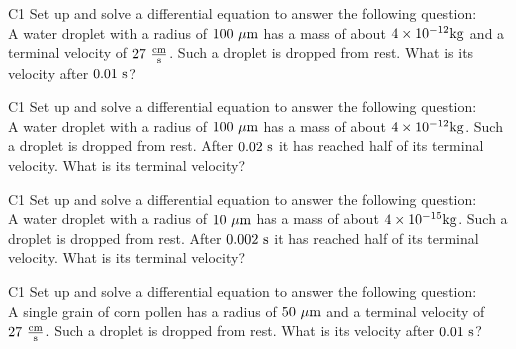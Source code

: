 \begin{problem}{C1}
Set up and solve a differential equation to answer the following question: \\
A water droplet with a radius of \(100\ {\rm \mu m}\) has a mass of about \(4 \times 10^{-12} {\rm kg}\) and a terminal velocity of \(27\ {\rm \frac{cm}{s}}\).  Such a droplet is dropped from rest.  What is its velocity after \(0.01\ {\rm s}\)?
\end{problem}

\begin{problem}{C1}
Set up and solve a differential equation to answer the following question: \\
A water droplet with a radius of \(100\ {\rm \mu m}\) has a mass of about \(4 \times 10^{-12} {\rm kg}\).  Such a droplet is dropped from rest.  After \(0.02\ {\rm s}\) it has reached half of its terminal velocity.  What is its terminal velocity?
\end{problem}

\begin{problem}{C1}
Set up and solve a differential equation to answer the following question: \\
A water droplet with a radius of \(10\ {\rm \mu m}\) has a mass of about \(4 \times 10^{-15} {\rm kg}\).  Such a droplet is dropped from rest.  After \(0.002\ {\rm s}\) it has reached half of its terminal velocity.  What is its terminal velocity?
\end{problem}

\begin{problem}{C1}
Set up and solve a differential equation to answer the following question: \\
A single grain of corn pollen has a radius of \(50\ {\rm \mu m}\) and a terminal velocity of \(27\ {\rm \frac{cm}{s}}\).  Such a droplet is dropped from rest.  What is its velocity after \(0.01\ {\rm s}\)?
\end{problem}
